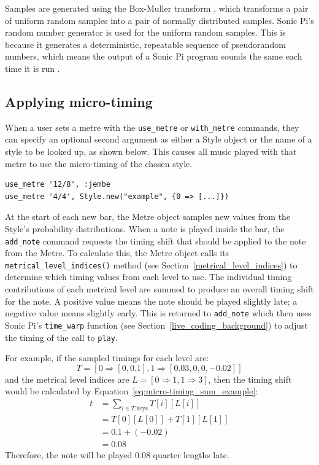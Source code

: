 \documentclass[12pt,twoside,openright]{report}
\begin{document}
Samples are generated using the
Box-Muller transform \cite{box1958}, which transforms a pair of uniform random
samples into a pair of normally distributed samples. Sonic Pi's random number
generator is used for the uniform random samples. This is because it generates a
deterministic, repeatable sequence of pseudorandom numbers, which means the output of
a Sonic Pi program sounds the same each time it is run \cite{aaron2016}.


\subsection{Applying micro-timing} \label{applying_micro-timing}

When a user sets a metre with the \verb'use_metre' or \verb'with_metre' commands, they can
specify an optional second argument as either a Style object or the name of a
style to be looked up, as shown below. This causes all music played with that metre to use the micro-timing of the chosen style.
\begin{verbatim}
use_metre '12/8', :jembe
use_metre '4/4', Style.new("example", {0 => [...]})
\end{verbatim}

At the start of each new bar, the Metre object samples new values from the
Style's probability distributions. When a note is played inside the bar, the
\verb'add_note' command requests the timing shift that should be applied to the note
from the Metre. To calculate this, the Metre object calls its
\verb'metrical_level_indices()' method (see Section~\ref{metrical_level_indices}) to determine which timing
values from each level to use. The individual timing contributions of each
metrical level are summed to produce an overall timing shift for the
note. A positive value means the note should be played slightly late; a negative
value means slightly early. This is returned to \verb'add_note' which then uses Sonic Pi's \verb'time_warp' function (see Section~\ref{live_coding_background}) to adjust the timing of the call to \verb'play'.

For example, if the sampled timings for each level are:
\[ T=[0\Rightarrow[0,0.1],1\Rightarrow[0.03,0,0,-0.02]] \]
and the metrical level indices are $L=[0\Rightarrow1,1\Rightarrow3]$, then the timing shift would be
calculated by Equation~\ref{eq:micro-timing_sum_example}:
\begin{equation}
    \begin{split}
        t &= \sum_{i \in T.\mathrm{keys}} T[i][L[i]] \\
        &=T[0][L[0]]+T[1][L[1]] \\
        &=0.1+(-0.02) \\
        &=0.08
    \end{split}
    \label{eq:micro-timing_sum_example}
\end{equation}
Therefore, the note will be played 0.08 quarter lengths late.
\end{document}
